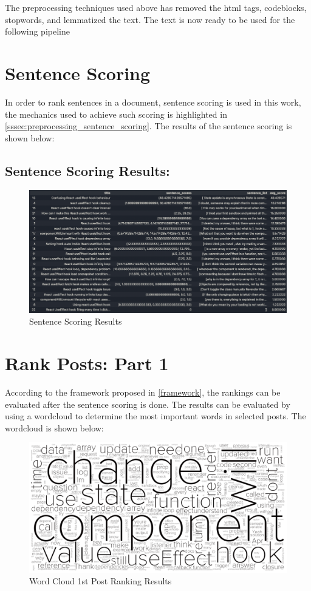 The preprocessing techniques used above has removed the html tags, codeblocks, stopwords, and lemmatized the text. The text is now ready to be used for the following pipeline

\section{Sentence Scoring} \label{sentence-scoring_results}
In order to rank sentences in a document, sentence scoring is used in this work, the mechanics used to achieve such scoring is highlighted in \ref{sssec:preprocessing_sentence_scoring}. The results of the sentence scoring is shown below:

\subsection{Sentence Scoring Results:} \label{sentence-scoring_results_results}
\begin{figure}[H]
  \centering
  \includegraphics[scale=0.65, angle=90]{assets/sentence-scoring.png}
  \caption{Sentence Scoring Results}
  \label{fig:sentence-scoring}
\end{figure}

\section{Rank Posts: Part 1} \label{rank-posts_1_results}
According to the framework proposed in \ref{framework}, the rankings can be evaluated after the sentence scoring is done. The results can be evaluated by using a wordcloud to determine the most important words in selected posts. The wordcloud is shown below:

\begin{figure}[H]
  \centering
  \includegraphics[scale=0.35]{rank_post_1.png}
  \caption{Word Cloud 1st Post Ranking  Results}
  \label{fig:rank_post_1_wc}
\end{figure}

